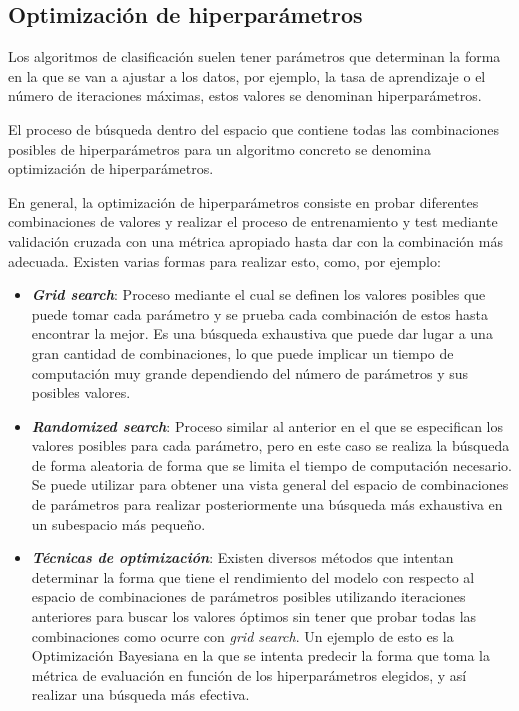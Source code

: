 \subsection{Optimización de hiperparámetros}

Los algoritmos de clasificación suelen tener parámetros que determinan la forma
en la que se van a ajustar a los datos, por ejemplo, la tasa de aprendizaje o el
número de iteraciones máximas, estos valores se denominan hiperparámetros.

El proceso de búsqueda dentro del espacio que contiene todas las combinaciones
posibles de hiperparámetros para un algoritmo concreto se denomina optimización
de hiperparámetros.

En general, la optimización de hiperparámetros consiste en probar diferentes
combinaciones de valores y realizar el proceso de entrenamiento y test mediante
validación cruzada con una métrica apropiado hasta dar con la combinación más
adecuada. Existen varias formas para realizar esto, como, por ejemplo:

\begin{itemize}
    \item \textbf{\textit{Grid search}}: Proceso mediante el cual se definen los
    valores posibles que puede tomar cada parámetro y se prueba cada combinación
    de estos hasta encontrar la mejor. Es una búsqueda exhaustiva que puede dar
    lugar a una gran cantidad de combinaciones, lo que puede implicar un tiempo
    de computación muy grande dependiendo del número de parámetros y sus
    posibles valores.
    \item \textbf{\textit{Randomized search}}: Proceso similar al anterior en el
    que se especifican los valores posibles para cada parámetro, pero en este
    caso se realiza la búsqueda de forma aleatoria de forma que se limita el
    tiempo de computación necesario. Se puede utilizar para obtener una vista
    general del espacio de combinaciones de parámetros para realizar
    posteriormente una búsqueda más exhaustiva en un subespacio más pequeño.
    \item \textbf{\textit{Técnicas de optimización}}: Existen diversos métodos
    que intentan determinar la forma que tiene el rendimiento del modelo con
    respecto al espacio de combinaciones de parámetros posibles utilizando
    iteraciones anteriores para buscar los valores óptimos sin tener que probar
    todas las combinaciones como ocurre con \textit{grid search}. Un ejemplo de
    esto es la Optimización Bayesiana \cite{wu2019hyperparameter} en la que se
    intenta predecir la forma que toma la métrica de evaluación en función de
    los hiperparámetros elegidos, y así realizar una búsqueda más efectiva.
\end{itemize}
